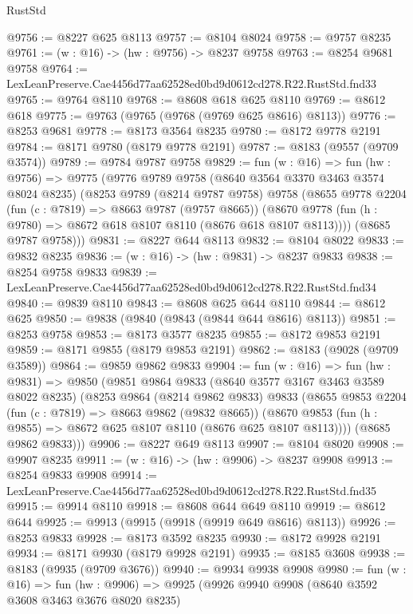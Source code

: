 \begin{lexlean}{RustStd}
\begin{coremodule}
@9756 := @8227 @625 @8113
@9757 := @8104 @8024
@9758 := @9757 @8235
@9761 := (w : @16) -> (hw : @9756) -> @8237 @9758
@9763 := @8254 @9681 @9758
@9764 := LexLeanPreserve.Cae4456d77aa62528ed0bd9d0612cd278.R22.RustStd.fnd33
@9765 := @9764 @8110
@9768 := @8608 @618 @625 @8110
@9769 := @8612 @618
@9775 := @9763 (@9765 (@9768 (@9769 @625 @8616) @8113))
@9776 := @8253 @9681
@9778 := @8173 @3564 @8235
@9780 := @8172 @9778 @2191
@9784 := @8171 @9780 (@8179 @9778 @2191)
@9787 := @8183 (@9557 (@9709 @3574))
@9789 := @9784 @9787 @9758
@9829 := fun (w : @16) =>
  fun (hw : @9756) =>
  @9775
    (@9776
      @9789
      @9758
      (@8640 @3564 @3370 @3463 @3574 @8024 @8235)
      (@8253
        @9789
        (@8214 @9787 @9758)
        @9758
        (@8655
          @9778
          @2204
          (fun (c : @7819) => @8663 @9787 (@9757 @8665))
          (@8670 @9778 (fun (h : @9780) => @8672 @618 @8107 @8110 (@8676 @618 @8107 @8113))))
        (@8685 @9787 @9758)))
@9831 := @8227 @644 @8113
@9832 := @8104 @8022
@9833 := @9832 @8235
@9836 := (w : @16) -> (hw : @9831) -> @8237 @9833
@9838 := @8254 @9758 @9833
@9839 := LexLeanPreserve.Cae4456d77aa62528ed0bd9d0612cd278.R22.RustStd.fnd34
@9840 := @9839 @8110
@9843 := @8608 @625 @644 @8110
@9844 := @8612 @625
@9850 := @9838 (@9840 (@9843 (@9844 @644 @8616) @8113))
@9851 := @8253 @9758
@9853 := @8173 @3577 @8235
@9855 := @8172 @9853 @2191
@9859 := @8171 @9855 (@8179 @9853 @2191)
@9862 := @8183 (@9028 (@9709 @3589))
@9864 := @9859 @9862 @9833
@9904 := fun (w : @16) =>
  fun (hw : @9831) =>
  @9850
    (@9851
      @9864
      @9833
      (@8640 @3577 @3167 @3463 @3589 @8022 @8235)
      (@8253
        @9864
        (@8214 @9862 @9833)
        @9833
        (@8655
          @9853
          @2204
          (fun (c : @7819) => @8663 @9862 (@9832 @8665))
          (@8670 @9853 (fun (h : @9855) => @8672 @625 @8107 @8110 (@8676 @625 @8107 @8113))))
        (@8685 @9862 @9833)))
@9906 := @8227 @649 @8113
@9907 := @8104 @8020
@9908 := @9907 @8235
@9911 := (w : @16) -> (hw : @9906) -> @8237 @9908
@9913 := @8254 @9833 @9908
@9914 := LexLeanPreserve.Cae4456d77aa62528ed0bd9d0612cd278.R22.RustStd.fnd35
@9915 := @9914 @8110
@9918 := @8608 @644 @649 @8110
@9919 := @8612 @644
@9925 := @9913 (@9915 (@9918 (@9919 @649 @8616) @8113))
@9926 := @8253 @9833
@9928 := @8173 @3592 @8235
@9930 := @8172 @9928 @2191
@9934 := @8171 @9930 (@8179 @9928 @2191)
@9935 := @8185 @3608
@9938 := @8183 (@9935 (@9709 @3676))
@9940 := @9934 @9938 @9908
@9980 := fun (w : @16) =>
  fun (hw : @9906) =>
  @9925
    (@9926
      @9940
      @9908
      (@8640 @3592 @3608 @3463 @3676 @8020 @8235)

\end{coremodule}
\end{lexlean}
